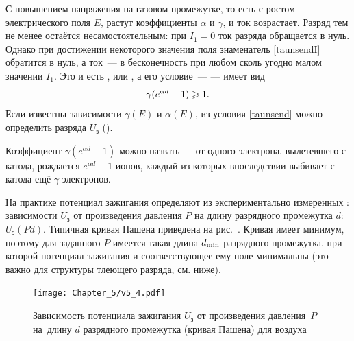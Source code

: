 С повышением напряжения на газовом промежутке, то есть с ростом электрического
поля $E$, растут коэффициенты $\alpha$ и $\gamma$, и ток возрастает.
Разряд тем не менее остаётся несамостоятельным: при $I_1=0$ ток разряда
обращается в нуль. Однако при достижении некоторого значения поля
знаменатель \eqref{taunsendI} обратится в нуль,
а ток~--- в бесконечность при любом сколь угодно малом значении $I_1$.
Это и есть , или , а его
условие~---  --- имеет вид
\begin{equation}
    \eqmark{taunsend}
	\gamma(e^{\alpha d}-1)\ge 1.
\end{equation}
Если известны зависимости $\gamma(E)$ и $\alpha(E)$, из условия \eqref{taunsend}
можно определить  разряда $U_{з}$
().

Коэффициент $\gamma (e^{\alpha d}-1)$ можно назвать
 --- от одного электрона,
вылетевшего с катода, рождается $e^{\alpha d}-1$ ионов,
каждый из которых впоследствии выбивает с катода ещё $\gamma$ электронов.

На практике потенциал зажигания определяют из экспериментально измеренных
: зависимости $U_{з}$ от произведения
давления $P$ на длину разрядного промежутка $d$: $U_{з}(Pd)$.
Типичная кривая Пашена приведена на рис.~.
Кривая имеет минимум, поэтому для заданного $P$ имеется такая длина
$d_{\rm min}$ разрядного промежутка,
при которой потенциал зажигания и соответствующее ему поле минимальны
(это важно для структуры тлеющего разряда, см. ниже).

\begin{figure}[h!]
	\centering
	\texttt{[image: Chapter\_5/v5\_4.pdf]}
	\caption{Зависимость потенциала зажигания $U_\text{з}$ от произведения
давления~$P$ на~длину $d$ разрядного промежутка (кривая Пашена) для воздуха}
\end{figure}

